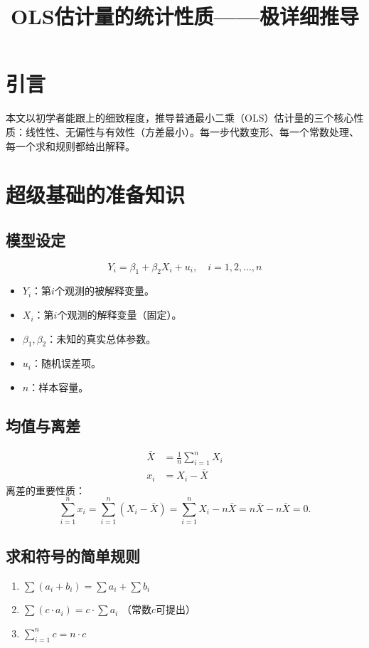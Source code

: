 \documentclass[12pt]{article}
\title{OLS估计量的统计性质——极详细推导}
\author{}
\date{}
\begin{document}
\maketitle

\section*{引言}
本文以初学者能跟上的细致程度，推导普通最小二乘（OLS）估计量的三个核心性质：线性性、无偏性与有效性（方差最小）。每一步代数变形、每一个常数处理、每一个求和规则都给出解释。

\section{超级基础的准备知识}
\subsection{模型设定}
\[
Y_i = \beta_1 + \beta_2 X_i + u_i,\quad i=1,2,\dots,n
\]
\begin{itemize}
    \item $Y_i$：第$i$个观测的被解释变量。
    \item $X_i$：第$i$个观测的解释变量（固定）。
    \item $\beta_1,\beta_2$：未知的真实总体参数。
    \item $u_i$：随机误差项。
    \item $n$：样本容量。
\end{itemize}

\subsection{均值与离差}
\begin{align*}
\bar{X} &= \frac{1}{n}\sum_{i=1}^n X_i\\
x_i &= X_i - \bar{X}
\end{align*}
离差的重要性质：
\[
\sum_{i=1}^n x_i = \sum_{i=1}^n (X_i - \bar{X}) = \sum_{i=1}^n X_i - n\bar{X} = n\bar{X} - n\bar{X} = 0.
\]

\subsection{求和符号的简单规则}
\begin{enumerate}
    \item $\sum (a_i + b_i) = \sum a_i + \sum b_i$
    \item $\sum (c\cdot a_i) = c \cdot \sum a_i$ （常数$c$可提出）
    \item $\sum_{i=1}^n c = n\cdot c$
\end{enumerate}
\end{document}

